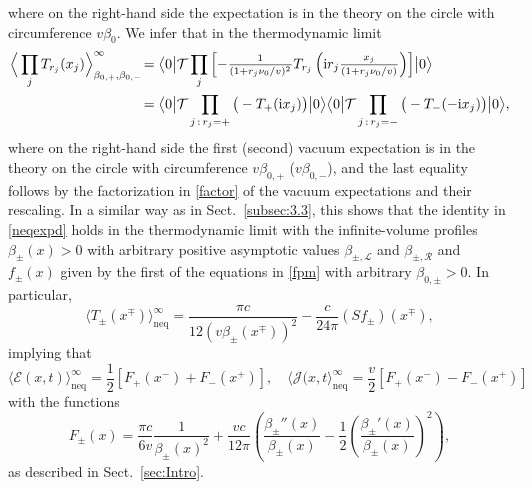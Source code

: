 \documentclass[12pt,a4paper]{article}
\newcommand{\ii}{{\rm i}}
\newcommand{\cE}{\mathcal{E}}
\newcommand{\cJ}{\mathcal{J}}
\newcommand{\cL}{\mathcal{L}}
\newcommand{\cR}{\mathcal{R}}
\newcommand{\cT}{\mathcal{T}}
\theoremstyle{definition}
\theoremstyle{remark}
\begin{document}
%
where on the right-hand side the expectation is in the theory on the circle with circumference $v\beta_0$.
We infer that in the thermodynamic limit
%
\begin{align}
\Big\langle \prod_{j} T_{r_j}(x_j) \Big\rangle^\infty_{\beta_{0,+},\beta_{0,-}} \! 
& = \bigl\langle0\bigl|
			\cT \prod_{j} \left[
				- \frac{_1}{^{(1+r_j{\nu_0}/{v})^{2}}}
					T_{r_j} \left( \ii r_j\frac{_{x_j}}{^{(1+r_j{\nu_0}/{v})}} \right)
			\right]
		\bigr|0\bigr\rangle \nonumber \\
& = \bigl\langle0\bigl|
			\cT \prod_{j \, : \, r_j=+} \big( - T_{+}(\ii x_j) \big)
		\bigr|0\bigr\rangle
		\bigl\langle0\bigl|
			\cT \prod_{j \, : \, r_j=-} \big( - T_{-}(-\ii x_j) \big)
		\bigr|0\bigr\rangle,
\end{align}
%
where on the right-hand side the first (second) vacuum expectation is in the theory on the circle with circumference $v\beta_{0,+}$ ($v\beta_{0,-}$), and the last equality follows by the factorization in \eqref{factor} of the vacuum expectations and their rescaling.
In a similar way as in Sect.~\ref{subsec:3.3}, this shows that the identity in \eqref{neqexpd} holds in the thermodynamic limit with the infinite-volume profiles $\beta_{\pm}(x)>0$ with arbitrary positive asymptotic values $\beta_{\pm,\cL}$ and $\beta_{\pm,\cR}$ and $f_{\pm}(x)$ given by the first of the equations in \eqref{fpm} with arbitrary $\beta_{0,\pm}>0$.
In particular,
%
\begin{equation}
\big\langle T_{\pm}(x^{\mp})\big\rangle^\infty_{\text{neq}}
= \frac{\pi c}{12(v\beta_{\pm}(x^\mp))^2}-\frac{c}{24\pi}(Sf_{\pm})(x^\mp),
\end{equation}
%
implying that
%
\begin{equation} 
\label{EP2}
\bigl\langle\cE(x,t) \bigr\rangle^\infty_{\text{neq}}
= \frac{1}{2} \left[ F_{+}(x^-) + F_{-}(x^+) \right],
\quad 
\bigl\langle \cJ(x,t \bigr\rangle^\infty_{\text{neq}}
= \frac{v}{2} \left[ F_{+}(x^-) - F_{-}(x^+) \right] 
\end{equation}
%
with the functions
%
\begin{equation} 
\label{G2}
F_{\pm}(x)
= \frac{\pi c}{6v}\frac{1}{\beta_{\pm}(x)^2} + \frac{vc}{12\pi}
	\left(
		\frac{\beta_{\pm}''(x)}{\beta_{\pm}(x)} - \frac{1}{2}
		\left( \frac{\beta_{\pm}'(x)}{\beta_{\pm}(x)} \right)^2
	\right), 
\end{equation}
%
as described in Sect.~\ref{sec:Intro}.
\end{document}
